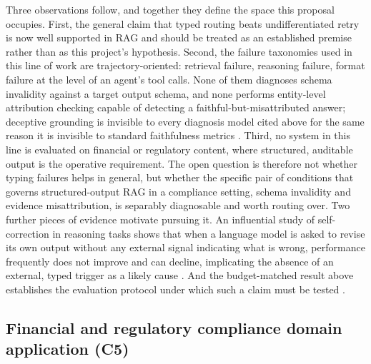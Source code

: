 \documentclass[10pt,twocolumn,letterpaper]{article}
\begin{document}
Three observations follow, and together they define the space this proposal occupies. First, the general claim that typed routing beats undifferentiated retry is now well supported in RAG and should be treated as an established premise rather than as this project's hypothesis. Second, the failure taxonomies used in this line of work are trajectory-oriented: retrieval failure, reasoning failure, format failure at the level of an agent's tool calls. None of them diagnoses schema invalidity against a target output schema, and none performs entity-level attribution checking capable of detecting a faithful-but-misattributed answer; deceptive grounding is invisible to every diagnosis model cited above for the same reason it is invisible to standard faithfulness metrics \cite{deceptive}. Third, no system in this line is evaluated on financial or regulatory content, where structured, auditable output is the operative requirement. The open question is therefore not whether typing failures helps in general, but whether the specific pair of conditions that governs structured-output RAG in a compliance setting, schema invalidity and evidence misattribution, is separably diagnosable and worth routing over. Two further pieces of evidence motivate pursuing it. An influential study of self-correction in reasoning tasks shows that when a language model is asked to revise its own output without any external signal indicating what is wrong, performance frequently does not improve and can decline, implicating the absence of an external, typed trigger as a likely cause \cite{cannotselfcorrect}. And the budget-matched result above establishes the evaluation protocol under which such a claim must be tested \cite{budgetrepair}.

\subsection{Financial and regulatory compliance domain application (C5)}
\end{document}
